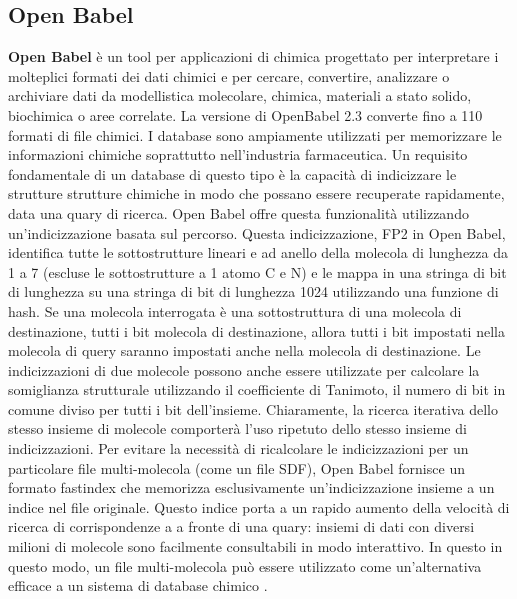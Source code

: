 \subsection{Open Babel}
\def\baselinestretch{1.66}
\noindent \textbf{Open Babel} è un tool per applicazioni di chimica progettato per interpretare i molteplici formati dei dati chimici e per cercare, convertire, analizzare o archiviare dati da modellistica molecolare, chimica, materiali a stato solido, biochimica o aree correlate.\newline
La versione di OpenBabel 2.3 converte fino a 110 formati di file chimici.\newline
I database sono ampiamente utilizzati per memorizzare le informazioni chimiche soprattutto nell'industria farmaceutica. Un requisito fondamentale di un database di questo tipo è la capacità di indicizzare le strutture strutture chimiche in modo che possano essere recuperate rapidamente, data una quary di ricerca. Open Babel offre questa funzionalità utilizzando un'indicizzazione basata sul percorso. Questa indicizzazione, FP2 in Open Babel, identifica tutte le sottostrutture lineari e ad anello della molecola di lunghezza da 1 a 7 (escluse le sottostrutture a 1 atomo C e N) e le mappa in una stringa di bit di lunghezza su una stringa di bit di lunghezza 1024 utilizzando una funzione di hash. Se una molecola interrogata è una sottostruttura di una molecola di destinazione, tutti i bit molecola di destinazione, allora tutti i bit impostati nella molecola di query saranno impostati anche nella molecola di destinazione. Le indicizzazioni
di due molecole possono anche essere utilizzate per calcolare la somiglianza strutturale utilizzando il coefficiente di Tanimoto, il numero di bit in comune diviso per tutti i bit dell'insieme.
Chiaramente, la ricerca iterativa dello stesso insieme di molecole comporterà l'uso ripetuto dello stesso insieme di indicizzazioni. Per evitare la necessità di ricalcolare le indicizzazioni per un particolare file multi-molecola (come un file SDF), Open Babel fornisce un formato fastindex che memorizza esclusivamente un'indicizzazione insieme a un indice nel file originale. Questo indice porta a un rapido aumento della velocità di ricerca di corrispondenze a a fronte di una quary: insiemi di dati con diversi milioni di molecole sono facilmente consultabili in modo interattivo. In questo in questo modo, un file multi-molecola può essere utilizzato come un'alternativa efficace a un sistema di database chimico \cite{o2011open}.

